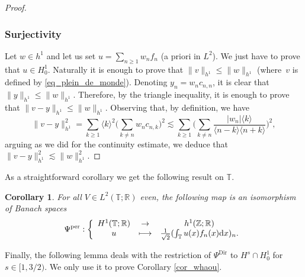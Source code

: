 \documentclass[11pt]{article}
\providecommand{\dpl}{\displaystyle}
\newcommand\mto{\mathchoice{\longmapsto}{\mapsto}{\mapsto}{\mapsto}}
\newtheorem{corollary}[theorem]{Corollary}
\theoremstyle{definition}
\begin{document}
\begin{proof}
\subsubsection*{Surjectivity}
Let $w\in h^1$ and let us set $u = \sum_{n\geq 1} w_n f_n$ (a priori in $L^2$). We just have to prove that $u \in H^1_0$. Naturally it is enough to prove that $\|v\|_{h^1} \leq \|w\|_{h^1}$ (where~$v$ is defined by \eqref{eq_plein_de_monde}). Denoting $y_n = w_n c_{n,n}$, it is clear that $\| y\|_{h^1} \leq \|w\|_{h^1}$. Therefore, by the triangle inequality, it is enough to prove that $\|v-y\|_{h^1} \leq \|w\|_{h^1}$. Observing that, by definition, we have
\[
\|v-y\|_{h^1}^2 = \sum_{k \geq 1} \langle k\rangle^2 \biggl(\sum_{k\neq n} w_n c_{n,k} \biggr)^2 \lesssim \sum_{k \geq 1} \biggl(\sum_{k\neq n} \frac{|w_n| \langle k \rangle}{\langle n-k \rangle \langle n+k \rangle } \biggr)^2,
\]
arguing as we did for the continuity estimate, we deduce that $\|v-y\|_{h^1}^2\lesssim \| w \|_{h^1}^2$.
\end{proof}
As a straightforward corollary we get the following result on $\mathbb{T}$.
\begin{corollary}
\label{cor_id_per}
For all $V\in L^2(\mathbb{T};\mathbb{R})$ even, the following map is an isomorphism of Banach spaces
\[
\Psi^{\mathrm{per}}:\left\{ \begin{array}{ccc} H^1(\mathbb{T};\mathbb{R}) & \dpl\to & h^1(\mathbb{Z};\mathbb{R}) \\
u & \dpl\mto & \frac1{\sqrt2} (\int_\mathbb{T} u(x) f_n(x) \mathrm{d}x)_n.
\end{array} \right.
\]
\end{corollary}

Finally, the following lemma deals with the restriction of $\Psi^{\mathrm{Dir}}$ to $H^{s}\cap H^1_0$ for $s\in[1,3/2)$. We only use it to prove Corollary \ref{cor_whaou}.
\end{document}
